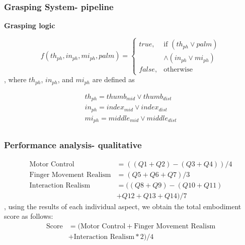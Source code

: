 \documentclass{beamer}
\theoremstyle{remark}
\theoremstyle{plain}
\begin{document}
\setcounter{framenumber}{\thelastframe}

\begin{frame}
	\frametitle{Grasping System- pipeline}
	
	\textbf{Grasping logic}
	
	\begin{equation} \label{eq:3}
	f(th_{ph}, in_{ph}, mi_{ph}, palm)= 
	\begin{cases}
	true, & \text{if } (th_{ph} \lor palm) \\
	& \land (in_{ph} \lor mi_{ph})\\
	false,              & \text{otherwise}
	\end{cases}
	\end{equation}, where $th_{ph}$, $in_{ph}$, and $mi_{ph}$ are defined as
	
	\begin{equation} \label{eq:4}
	\begin{array}{l}
	th_{ph} = thumb_{mid} \lor thumb_{dist} \\
	in_{ph} = index_{mid} \lor index_{dist} \\
	mi_{ph} = middle_{mid} \lor middle_{dist} \\
	\end{array}
	\end{equation}
	
\end{frame}

\begin{frame}
	\frametitle{Performance analysis- qualitative}
	
	
	\begin{equation}\label{eq:6}
	\begin{split}
	\text{Motor Control} &= ((Q1 + Q2) - (Q3 + Q4)) / 4 \\
	\text{Finger Movement Realism} &= (Q5 + Q6 + Q7) / 3 \\
	\text{Interaction Realism} &= ((Q8 + Q9) - (Q10 + Q11)\\
	& + Q12 + Q13 + Q14) / 7 
	\end{split}
	\end{equation}, using the results of each individual aspect, we obtain the total embodiment score as follows:
	\begin{equation} \label{eq:5}
	\begin{split}
	\text{Score} &= (\text{Motor Control} + \text{Finger Movement Realism} \\
	& + \text{Interaction Realism} * 2) / 4
	\end{split}
	\end{equation}
	
\end{frame}
\end{document}
